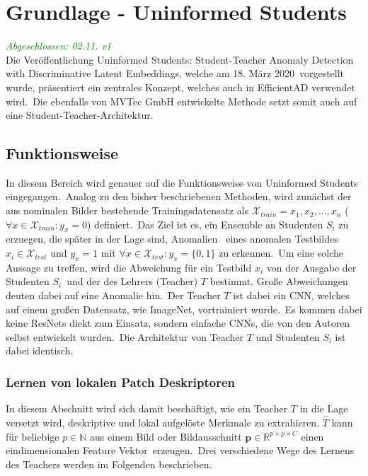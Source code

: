 \section{Grundlage - Uninformed Students}\label{sec:GrundlageUninformedStudents}
\textcolor{green}{\textit{Abgeschlossen: 02.11. v1}}\\
Die Veröffentlichung \glqq Uninformed Students: Student-Teacher Anomaly Detection with Discriminative Latent Embeddings\grqq{}, welche am 18. März 2020\
vorgestellt wurde, präsentiert ein zentrales Konzept, welches auch in EfficientAD verwendet wird.\
Die ebenfalls von MVTec GmbH entwickelte Methode setzt somit auch auf eine Student-Teacher-Architektur.\
\subsection{Funktionsweise}
In diesem Bereich wird genauer auf die Funktionsweise von \glqq Uninformed Students\grqq{} eingegangen.\
Analog zu den bisher beschriebenen Methoden, wird zunächst der aus nominalen Bilder bestehende Trainingsdatensatz als
$\mathcal{X}_{train}={x_1, x_2, ..., x_n}$ ($\forall x \in \mathcal{X}_{train}: y_{x}=0$) definiert.\
Das Ziel ist es, ein Ensemble an \glqq Studenten\grqq{} $S_{i}$ zu erzuegen, die später in der Lage sind, Anomalien \
eines anomalen Testbildes $x_{i}\in\mathcal{X}_{test}$ und $y_{x} = 1$ mit $\forall x \in \mathcal{X}_{test}: y_{x}=\{0,1\}$ zu erkennen.\
Um eine solche Aussage zu treffen, wird die Abweichung für ein Testbild $x_{i}$ von der Ausgabe der Studenten $S_{i}$\
und der des \glqq Lehrers\grqq{} (Teacher) $T$ bestimmt. Große Abweichungen deuten dabei auf eine Anomalie hin.\
Der Teacher $T$ ist dabei ein CNN, welches auf einem großen Datensatz, wie ImageNet, vortrainiert wurde.\
Es kommen dabei keine ResNets diekt zum Einsatz, sondern einfache CNNs, die von den Autoren selbst entwickelt wurden.\
Die Architektur von Teacher $T$ und Studenten $S_{i}$ ist dabei identisch.\
\subsubsection*{Lernen von lokalen Patch Deskriptoren}
In diesem Abschnitt wird sich damit beschäftigt, wie ein Teacher $T$ in die Lage versetzt wird,
deskriptive und lokal aufgelöste Merkmale zu extrahieren. %
$\hat{T}$ kann für beliebige $p\in\mathbb{N}$ aus einem Bild oder Bildausschnitt $\mathbf{p}\in\mathbb{R}^{p\times p\times C}$ einen eindimensionalen Feature Vektor\
erzeugen.\ 
Drei verschiedene Wege des Lernens des Teachers werden im Folgenden beschrieben.\
